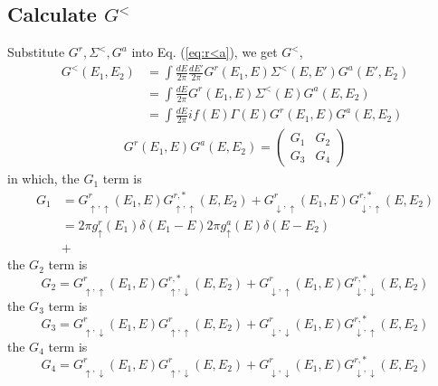 \documentclass[11pt,a4paper]{article}
\begin{document}
\subsection{Calculate $G^{<}$}
Substitute $G^{r}, \Sigma^{<}, G^{a}$ into Eq. (\ref{eq:r<a}), we get $G^{<}$,
\begin{equation}
\begin{split}
G^{<}(E_{1},E_{2})&=\int\frac{dE}{2\pi}\frac{dE'}{2\pi}G^{r}(E_{1}, E) \Sigma^{<}(E, E') G^{a}(E', E_{2}) \\
&= \int \frac{dE}{2\pi} G^{r}\left(E_{1}, E\right) \Sigma^{<}\left(E\right) G^{a}\left(E, E_{2}\right) \\
&= \int \frac{dE}{2\pi} if(E)\Gamma(E) G^{r}\left(E_{1}, E\right) G^{a}\left(E, E_{2}\right)
\end{split}
\end{equation}
\begin{equation}
\begin{split}
G^{r}\left(E_{1}, E\right) G^{a}\left(E, E_{2}\right) =
\left(\begin{array}{cc}
G_{1} & G_{2} \\
G_{3} & G_{4}
\end{array}\right)
\end{split}
\end{equation}
in which, the $G_{1}$ term is
\begin{equation}
\begin{split}
G_{1} &= G_{\uparrow, \uparrow}^{r}(E_{1}, E)G_{\uparrow, \uparrow}^{r,*}(E, E_{2})+G_{\downarrow, \uparrow}^{r}(E_{1},E)G_{\downarrow, \uparrow}^{r,*}(E,E_{2}) \\
&= 2 \pi g_{\uparrow}^{r}\left(E_{1}\right) \delta\left(E_{1}-E\right) 2 \pi g_{\uparrow}^{a}\left(E\right) \delta\left(E-E_{2}\right) \\
& + 
\end{split}
\end{equation}
the $G_{2}$ term is
\begin{equation}
G_{2} = G_{\uparrow, \uparrow}^{r}(E_{1}, E)G_{\uparrow, \downarrow}^{r,*}(E,E_{2}) + G_{\downarrow, \uparrow}^{r}(E_{1}, E)G_{\downarrow, \downarrow}^{r,*}(E,E_{2})
\end{equation}
the $G_{3}$ term is
\begin{equation}
G_{3} = G_{\uparrow, \downarrow}^{r}(E_{1},E)G_{\uparrow, \uparrow}^{r}(E, E_{2}) + G_{\downarrow, \downarrow}^{r}(E_{1},E)G_{\downarrow, \uparrow}^{r,*}(E,E_{2})
\end{equation}
the $G_{4}$ term is
\begin{equation}
G_{4} =  G_{\uparrow, \downarrow}^{r}(E_{1},E)G_{\uparrow, \downarrow}^{r}(E, E_{2}) + G_{\downarrow, \downarrow}^{r}(E_{1},E)G_{\downarrow, \downarrow}^{r,*}(E,E_{2})  
\end{equation}
\end{document}

